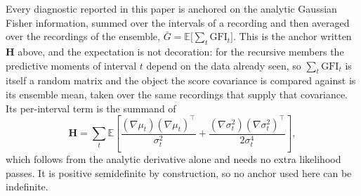 Every diagnostic reported in this paper is anchored on the analytic Gaussian Fisher
information, summed over the intervals of a recording and then averaged over the
recordings of the ensemble, $\bar G = \mathbb{E}\bigl[\sum_t \mathrm{GFI}_t\bigr]$. This
is the anchor written $\mathbf{H}$ above, and the expectation is not
decoration: for the recursive members the predictive moments of interval $t$ depend on the
data already seen, so $\sum_t \mathrm{GFI}_t$ is itself a random matrix and the object the
score covariance is compared against is its ensemble mean, taken over the same recordings
that supply that covariance. Its per-interval term is the summand of
\begin{equation}
  \mathbf{H}=\sum_t\mathbb{E}\!\left[
    \frac{(\nabla\mu_t)(\nabla\mu_t)^\top}{\sigma_t^2}
    +\frac{(\nabla\sigma_t^2)(\nabla\sigma_t^2)^\top}{2\sigma_t^4}\right],
  \label{eq:gaussian-fisher}
\end{equation}
which follows from the analytic derivative alone and needs no extra likelihood
passes. It is positive semidefinite by construction, so no anchor used here can be
indefinite.


